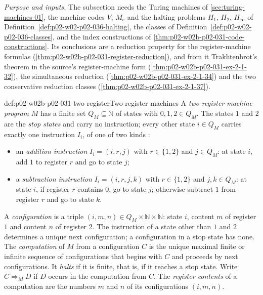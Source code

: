 \emph{Purpose and inputs.}  The subsection needs the Turing machines of
\cref{sec:turing-machines-01}, the machine codes \(V\), \(M_e\) and the halting
problems \(H_1\), \(H_2\), \(H_\infty\) of
Definition~\ref{def:p02-w02-p02-036-halting}, the classes of
Definition~\ref{def:p02-w02-p02-036-classes}, and the index constructions of
\cref{thm:p02-w02b-p02-031-code-constructions}.  Its conclusions are a
reduction property for the register-machine formulas
(\cref{thm:p02-w02b-p02-031-register-reduction}), and from it
Trakhtenbrot's theorem in the source's register-machine form
(\cref{thm:p02-w02b-p02-031-ex-2-1-32}), the simultaneous reduction
(\cref{thm:p02-w02b-p02-031-ex-2-1-34}) and the two conservative reduction
classes (\cref{thm:p02-w02b-p02-031-ex-2-1-37}).

\begin{hbdefinition}{def:p02-w02b-p02-031-two-register}{Two-register machines}
A \emph{two-register machine program} \(M\) has a finite set
\(Q_M\subseteq\mathbb N\) of states with \(0,1,2\in Q_M\).  The states \(1\)
and \(2\) are the \emph{stop states} and carry no instruction; every other
state \(i\in Q_M\) carries exactly one instruction \(I_i\), of one of two
kinds \cite[Sect.~2.1.1, pp.~27--29]{BorgerGradelGurevich1997}:
\begin{itemize}
\item an \emph{addition instruction} \(I_i=(i,r,j)\) with \(r\in\{1,2\}\) and
      \(j\in Q_M\): at state \(i\), add \(1\) to register \(r\) and go to
      state \(j\);
\item a \emph{subtraction instruction} \(I_i=(i,r,j,k)\) with \(r\in\{1,2\}\)
      and \(j,k\in Q_M\): at state \(i\), if register \(r\) contains \(0\), go
      to state \(j\); otherwise subtract \(1\) from register \(r\) and go to
      state \(k\).
\end{itemize}
A \emph{configuration} is a triple \((i,m,n)\in Q_M\times\mathbb N\times
\mathbb N\): state \(i\), content \(m\) of register \(1\) and content \(n\) of
register \(2\).  The instruction of a state other than \(1\) and \(2\)
determines a unique next configuration; a configuration in a stop state has
none.  The \emph{computation} of \(M\) from a configuration \(C\) is the unique
maximal finite or infinite sequence of configurations that begins with \(C\)
and proceeds by next configurations.  It \emph{halts} if it is finite, that
is, if it reaches a stop state.  Write \(C\Rightarrow_M D\) if \(D\) occurs in
the computation from \(C\).  The \emph{register contents} of a computation are
the numbers \(m\) and \(n\) of its configurations \((i,m,n)\).
\end{hbdefinition}

